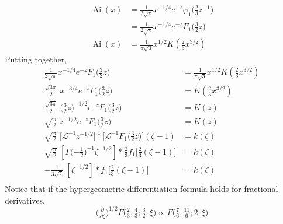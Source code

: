 \documentclass{article}
\theoremstyle{plain}
\newcommand{\laplace}{\mathcal{L}}
\DeclareMathOperator{\Ai}{Ai}
\begin{document}
\begin{align*}
\Ai(x) & = \tfrac{1}{2\sqrt{\pi}} x^{-1/4} e^{-z} \varphi_1\big(\tfrac{2}{3} z^{-1}\big) \\
& = \tfrac{1}{2\sqrt{\pi}} x^{-1/4} e^{-z} F_1\big(\tfrac{3}{2} z\big) \\
\Ai(x) & = \frac{1}{\pi\sqrt{3}} x^{1/2} K(\tfrac{2}{3} x^{3/2})
\end{align*}
Putting together,
\begin{align*}
\tfrac{1}{2\sqrt{\pi}} x^{-1/4} e^{-z} F_1\big(\tfrac{3}{2} z\big) & = \frac{1}{\pi\sqrt{3}} x^{1/2} K(\tfrac{2}{3} x^{3/2}) \\
\tfrac{\sqrt{3\pi}}{2}\;x^{-3/4} e^{-z} F_1\big(\tfrac{3}{2} z\big) & = K(\tfrac{2}{3} x^{3/2}) \\
\tfrac{\sqrt{3\pi}}{2}\;\big(\tfrac{3}{2} z)^{-1/2} e^{-z} F_1\big(\tfrac{3}{2} z\big) & = K(z) \\
\sqrt{\tfrac{\pi}{2}}\;z^{-1/2} e^{-z} F_1\big(\tfrac{3}{2} z\big) & = K(z) \\
\sqrt{\tfrac{\pi}{2}}\;\big[\laplace^{-1} z^{-1/2}\big] * \big[\laplace^{-1} F_1\big(\tfrac{3}{2} z\big)\big](\zeta - 1) & = k(\zeta) \\
\sqrt{\tfrac{\pi}{2}}\;\left[\Gamma\big({-\tfrac{1}{2}}\big)^{-1} \zeta^{-1/2}\right] * \tfrac{2}{3} f_1\big[\tfrac{2}{3}(\zeta - 1)\big] & = k(\zeta) \\
-\tfrac{1}{3\sqrt{2}}\;\left[\zeta^{-1/2}\right] * f_1\big[\tfrac{2}{3}(\zeta - 1)\big] & = k(\zeta) \\
\end{align*}
Notice that if the hypergeometric differentiation formula holds for fractional derivatives,
\[ \big(\tfrac{\partial}{\partial \xi}\big)^{1/2}F\big(\tfrac{2}{3}, \tfrac{4}{3}; \tfrac{3}{2}; \xi\big) \propto F\big(\tfrac{7}{6}, \tfrac{11}{6}; 2; \xi\big) \]


\end{document}
